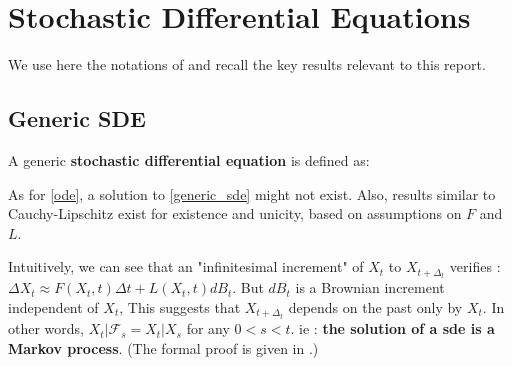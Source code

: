 \chapter{Stochastic Differential Equations}\label{sec:SDE_results}

We use here the notations of \cite{sarkka_applied_2019} and recall the key results relevant to this report.

\section{Generic SDE}

A generic \textbf{stochastic differential equation} is defined as:


As for \ref{ode}, a solution to \ref{generic_sde} might not exist. Also, results similar to Cauchy-Lipschitz 
exist for existence and unicity, based on assumptions on $F$ and $L$. 

Intuitively, we can see that an "infinitesimal increment" of $X_t$ to $X_{t+\Delta_t}$ verifies :
$\Delta {X_t} \approx F(X_t, t) \Delta t + L(X_t,t) dB_t$. But $dB_t$ is a Brownian increment independent of $X_t$,
This suggests that $X_{t+ \Delta_t}$ depends on the past only by $X_t$. In other words, $X_t \vert \mathcal{F}_s = X_t \vert X_s$ 
for any $0 < s < t$. ie : \textbf{the solution of a \gls{sde} is a Markov process}. (The formal proof is given in \cite{mouvement-brownien-calcul-ito}.)

